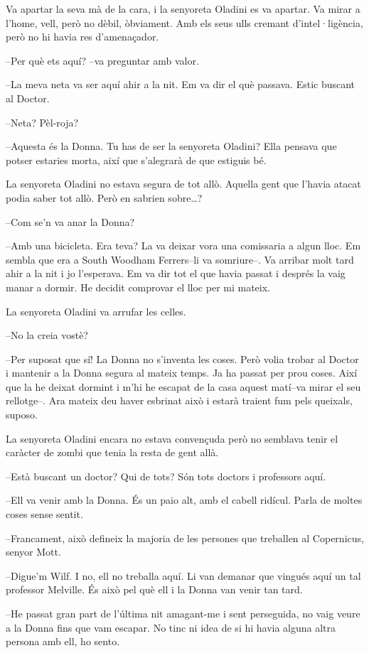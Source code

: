 Va apartar la seva mà de la cara, i la senyoreta Oladini es va apartar.
Va mirar a l'home, vell, però no dèbil, òbviament. Amb els seus ulls
cremant d'intel·ligència, però no hi havia res d'amenaçador.

--Per què ets aquí? --va preguntar amb valor.

--La meva neta va ser aquí ahir a la nit. Em va dir el què passava.
Estic buscant al Doctor.

--Neta? Pèl-roja?

--Aquesta és la Donna. Tu has de ser la senyoreta Oladini? Ella pensava
que potser estaries morta, així que s'alegrarà de que estiguis bé.

La senyoreta Oladini no estava segura de tot allò. Aquella gent que
l'havia atacat podia saber tot allò. Però en sabrien sobre\ldots{}?

--Com se'n va anar la Donna?

--Amb una bicicleta. Era teva? La va deixar vora una comissaria a algun
lloc. Em sembla que era a South Woodham Ferrers--li va somriure--. Va
arribar molt tard ahir a la nit i jo l'esperava. Em va dir tot el que
havia passat i després la vaig manar a dormir. He decidit comprovar el
lloc per mi mateix.

La senyoreta Oladini va arrufar les celles.

--No la creia vostè?

--Per suposat que sí! La Donna no s'inventa les coses. Però volia trobar
al Doctor i mantenir a la Donna segura al mateix temps. Ja ha passat per
prou coses. Així que la he deixat dormint i m'hi he escapat de la casa
aquest matí--va mirar el seu rellotge--. Ara mateix deu haver esbrinat
això i estarà traient fum pels queixals, suposo.

La senyoreta Oladini encara no estava convençuda però no semblava tenir
el caràcter de zombi que tenia la resta de gent allà.

--Està buscant un doctor? Qui de tots? Són tots doctors i professors
aquí.

--Ell va venir amb la Donna. És un paio alt, amb el cabell ridícul.
Parla de moltes coses sense sentit.

--Francament, això defineix la majoria de les persones que treballen al
Copernicus, senyor Mott.

--Digue'm Wilf. I no, ell no treballa aquí. Li van demanar que vingués
aquí un tal professor Melville. És això pel què ell i la Donna van venir
tan tard.

--He passat gran part de l'última nit amagant-me i sent perseguida, no
vaig veure a la Donna fins que vam escapar. No tinc ni idea de si hi
havia alguna altra persona amb ell, ho sento.

